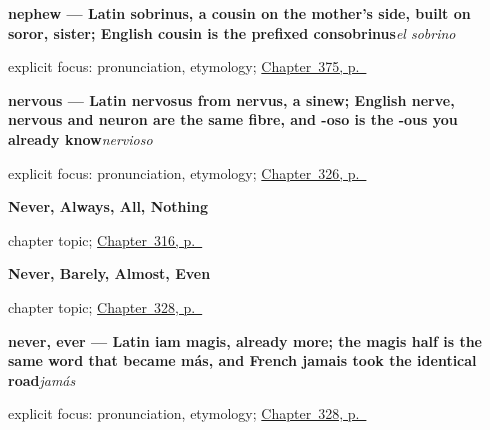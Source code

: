 \noindent\begin{minipage}[t]{\linewidth}
\raggedright
\textbf{nephew — Latin sobrinus, a cousin on the mother's side, built on soror, sister; English cousin is the prefixed consobrinus}\enspace\emph{el sobrino}\par
\footnotesize explicit focus: pronunciation, etymology; \hyperref[ch:la-una-y-el-labio]{Chapter~375, p.~\pageref*{ch:la-una-y-el-labio}}
\end{minipage}\par\smallskip

\noindent\begin{minipage}[t]{\linewidth}
\raggedright
\textbf{nervous — Latin nervosus from nervus, a sinew; English nerve, nervous and neuron are the same fibre, and -oso is the -ous you already know}\enspace\emph{nervioso}\par
\footnotesize explicit focus: pronunciation, etymology; \hyperref[ch:nervioso-y-listo]{Chapter~326, p.~\pageref*{ch:nervioso-y-listo}}
\end{minipage}\par\smallskip

\noindent\begin{minipage}[t]{\linewidth}
\raggedright
\textbf{Never, Always, All, Nothing}\par
\footnotesize chapter topic; \hyperref[ch:nunca-y-siempre]{Chapter~316, p.~\pageref*{ch:nunca-y-siempre}}
\end{minipage}\par\smallskip

\noindent\begin{minipage}[t]{\linewidth}
\raggedright
\textbf{Never, Barely, Almost, Even}\par
\footnotesize chapter topic; \hyperref[ch:asi-y-incluso]{Chapter~328, p.~\pageref*{ch:asi-y-incluso}}
\end{minipage}\par\smallskip

\noindent\begin{minipage}[t]{\linewidth}
\raggedright
\textbf{never, ever — Latin iam magis, already more; the magis half is the same word that became más, and French jamais took the identical road}\enspace\emph{jamás}\par
\footnotesize explicit focus: pronunciation, etymology; \hyperref[ch:asi-y-incluso]{Chapter~328, p.~\pageref*{ch:asi-y-incluso}}
\end{minipage}\par\smallskip

